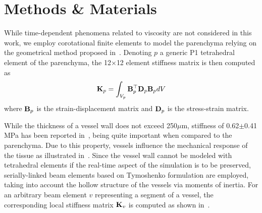 \section{Methods \& Materials}
\label{sec:methodology}


While time-dependent phenomena related to viscosity are not considered in this work, we employ corotational finite elements to model the parenchyma
relying on the geometrical method proposed in~\cite{Nesme2005}.
Denoting $p$ a generic P1 tetrahedral element of the parenchyma, the 12$\times$12 element stiffness matrix is then computed as
\begin{equation}
\mathbf{K}_p = \int_{V_p} \mathbf{B}_p^\top \mathbf{D}_p \mathbf{B}_p dV
\end{equation}
where $\mathbf{B}_p$ is the strain-displacement matrix and $\mathbf{D}_p$ is the stress-strain matrix.

While the thickness of a vessel wall does not exceed 250$\mu$m,%
stiffness of 0.62$\pm$0.41\,MPa has been reported 
in~\cite{Umale2011}, being quite important when compared to the parenchyma. Due to this property, vessels influence 
the mechanical response of the tissue as illustrated in~\cite{Peterlik2012}. Since the vessel wall cannot be modeled 
with tetrahedral elements if the real-time aspect of the simulation is to be preserved, 
serially-linked beam elements based on Tymoshenko formulation are employed, taking into account the hollow 
structure of the vessels via moments of inertia. 
For an arbitrary beam element $v$ representing a segment of a vessel, the corresponding local stiffness matrix $\mathbf{K}_v$ is computed as shown in~\cite{Duriez2006}.


